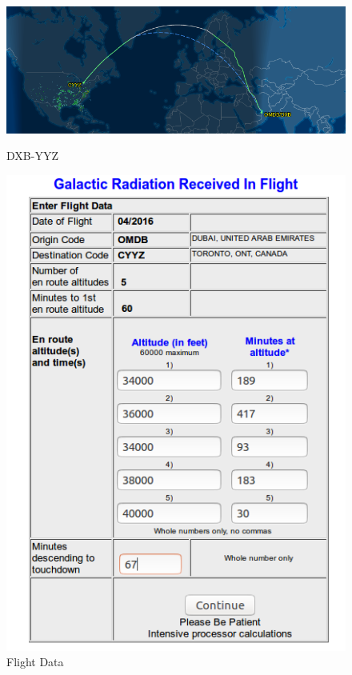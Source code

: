 \documentclass[english]{article}
\begin{document}
\begin{figure}[!htb]
  \includegraphics[width=\linewidth]{DXB-TO-YYZ.png}
 \caption*{DXB-YYZ}
\endminipage\hfill
{}
  \includegraphics[width=\linewidth]{DXB-TO-YYZ-DATA.png}
  \caption*{Flight Data}
\endminipage\hfill
{}%

\end{figure}
\end{document}
